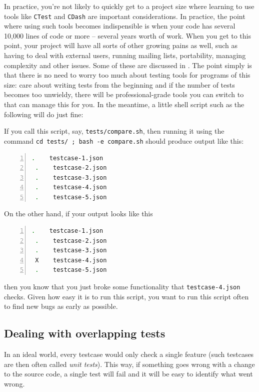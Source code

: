 \documentclass{article}
\begin{document}
In practice, you're not likely to quickly get to a project size where learning
to use tools like \texttt{CTest} and \texttt{CDash} are important
considerations. In practice, the point where using such tools becomes
indispensible is when your code has several 10,000 lines of code or more --
several years worth of work. When you get to this point, your project will
have all sorts of other growing pains as well, such as having to deal with
external users, running mailing lists, portability, managing complexity and
other issues. Some of these are discussed in \cite{BH13}. The point simply is
that there is no need to worry too much about testing tools for programs of
this size: care about writing tests from the beginning and if the number of
tests becomes too unwieldy, there will be professional-grade tools you can
switch to that can manage this for you. In the meantime, a little shell script
such as the following will do just fine:

If you call this script, say, \texttt{tests/compare.sh}, then running it using
the command \texttt{cd tests/ ; bash -e compare.sh} should produce output like
this:
\begin{lstlisting}[frame=single,basicstyle=\footnotesize,numbers=left,language=bash]
 .    testcase-1.json
 .    testcase-2.json
 .    testcase-3.json
 .    testcase-4.json
 .    testcase-5.json
\end{lstlisting}
On the other hand, if your output looks like this
\begin{lstlisting}[frame=single,basicstyle=\footnotesize,numbers=left,language=bash]
 .    testcase-1.json
 .    testcase-2.json
 .    testcase-3.json
 X    testcase-4.json
 .    testcase-5.json
\end{lstlisting}
then you know that you just broke some functionality that
\texttt{testcase-4.json} checks. Given how easy it is to run this script, you
want to run this script often to find new bugs as early as possible.


\subsection{Dealing with overlapping tests}

In an ideal world, every testcase would only check a single feature (such
testcases are then often called \textit{unit tests}). This way, if something
goes wrong with a change to the source code, a single test will fail and it
will be easy to identify what went wrong.
\end{document}

